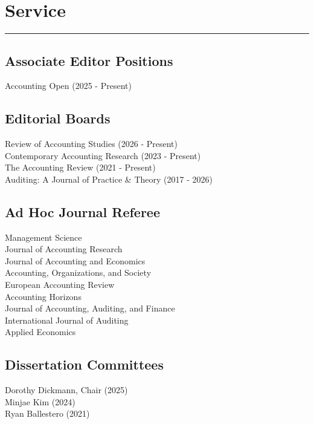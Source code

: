 \documentclass[]{deedy-resume-openfont}
\begin{document}
\section{Service}
\vspace*{-.25cm}
\rule{\textwidth}{0.3pt}
\begin{minipage}[t]{0.5\textwidth}

\subsection{Associate Editor Positions}
Accounting Open (2025 - Present)
\sectionsep

\subsection{Editorial Boards}
Review of Accounting Studies (2026 - Present) \\
Contemporary Accounting Research (2023 - Present) \\
The Accounting Review (2021 - Present) \\
Auditing: A Journal of Practice \& Theory (2017 - 2026)
\sectionsep

\subsection{Ad Hoc Journal Referee}
Management Science \\
Journal of Accounting Research \\
Journal of Accounting and Economics \\
Accounting, Organizations, and Society \\
European Accounting Review \\
Accounting Horizons \\
Journal of Accounting, Auditing, and Finance \\
International Journal of Auditing \\
Applied Economics
\sectionsep

\subsection{Dissertation Committees}
Dorothy Dickmann, Chair (2025) \\
Minjae Kim (2024) \\
Ryan Ballestero (2021) 
\sectionsep


\end{minipage} 
\hfill
\end{document}
